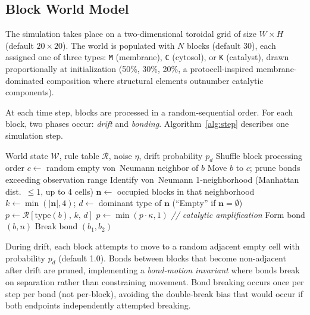 \documentclass[letterpaper]{article}
\begin{document}
\subsection{Block World Model}

The simulation takes place on a two-dimensional toroidal grid of size
$W \times H$ (default $20 \times 20$). The world is populated with $N$
blocks (default 30), each assigned one of three types: \texttt{M}
(membrane), \texttt{C} (cytosol), or \texttt{K} (catalyst), drawn
proportionally at initialization (50\%, 30\%, 20\%, a protocell-inspired
membrane-dominated composition where structural elements outnumber
catalytic components).

At each time step, blocks are processed in a random-sequential order.
For each block, two phases occur: \emph{drift} and \emph{bonding}.
Algorithm~\ref{alg:step} describes one simulation step.

\begin{algorithm}[t]
\caption{One simulation step (random-sequential mode)}
\label{alg:step}
\begin{algorithmic}[1]
\REQUIRE World state $\mathcal{W}$, rule table $\mathcal{R}$, noise $\eta$, drift probability $p_d$
\STATE Shuffle block processing order
    \STATE $c \gets$ random empty von~Neumann neighbor of $b$
      \STATE Move $b$ to $c$; prune bonds exceeding observation range
    \ENDIF
  \ENDIF
  \STATE Identify von~Neumann 1-neighborhood (Manhattan dist.\ $\leq 1$, up to 4 cells)
  \STATE $\mathbf{n} \gets$ occupied blocks in that neighborhood
  \STATE $k \gets \min(|\mathbf{n}|, 4)$; $d \gets$ dominant type of $\mathbf{n}$ (``Empty'' if $\mathbf{n} = \emptyset$)
  \STATE $p \gets \mathcal{R}[\text{type}(b),\, k,\, d]$
    \STATE $p \gets \min(p \cdot \kappa, 1)$ \hfill \textit{// catalytic amplification}
  \ENDIF
      \STATE Form bond $(b, n)$
    \ENDIF
  \ENDFOR
\ENDFOR
{}
    \STATE Break bond $(b_1, b_2)$
  \ENDIF
\ENDFOR
\end{algorithmic}
\end{algorithm}

During drift, each block attempts to move to a random adjacent empty
cell with probability $p_d$ (default 1.0). Bonds between blocks that
become non-adjacent after drift are pruned, implementing a
\emph{bond-motion invariant} where bonds break on separation rather than
constraining movement. Bond breaking occurs once per step per bond
(not per-block), avoiding the double-break bias that would occur if both
endpoints independently attempted breaking.
\end{document}

